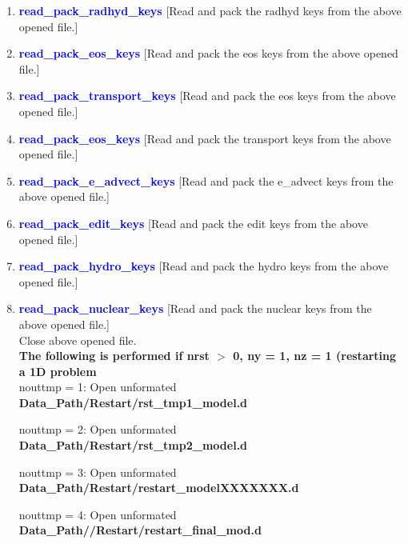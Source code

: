 \documentclass[11pt,doublespace]{article}
\begin{document}
\begin{itemize}
\begin{enumerate}
\begin{enumerate}
{\begin{enumerate}
\begin{enumerate}
  From the above opened file, the following read commands are performed.\\
  
  \item \textcolor{blue}{ {\bf read\_pack\_radhyd\_keys} }
  [Read and pack the radhyd keys  from the above opened file.]
  
  \item \textcolor{blue}{ {\bf read\_pack\_eos\_keys} }
  [Read and pack the eos keys  from the above opened file.]
  
  \item \textcolor{blue}{ {\bf read\_pack\_transport\_keys} }
  [Read and pack the eos keys  from the above opened file.]
  
  \item \textcolor{blue}{ {\bf read\_pack\_eos\_keys} }
  [Read and pack the transport keys  from the above opened file.]
  
  \item \textcolor{blue}{ {\bf read\_pack\_e\_advect\_keys} }
  [Read and pack the e\_advect keys  from the above opened file.]
  
  \item \textcolor{blue}{ {\bf read\_pack\_edit\_keys} }
  [Read and pack the edit keys  from the above opened file.]
  
  \item \textcolor{blue}{ {\bf read\_pack\_hydro\_keys} }
  [Read and pack the hydro keys  from the above opened file.]
  
  \item \textcolor{blue}{ {\bf read\_pack\_nuclear\_keys} }
  [Read and pack the nuclear keys  from the above opened file.]\\
  
  Close above opened file.\\

  {\bf The following is performed if nrst $>$ 0, ny = 1, nz = 1 (restarting a 1D problem} \\
  
  nouttmp = 1: Open unformated {\bf Data\_Path/Restart/rst\_tmp1\_model.d}
    
  nouttmp = 2: Open unformated {\bf Data\_Path/Restart/rst\_tmp2\_model.d}
    
  nouttmp = 3: Open unformated {\bf Data\_Path/Restart/restart\_modelXXXXXXX.d}
    
  nouttmp = 4: Open unformated {\bf Data\_Path//Restart/restart\_final\_mod.d}
    

\end{enumerate}
\end{enumerate}}
\end{enumerate}
\end{enumerate}
\end{itemize}
\end{document}
